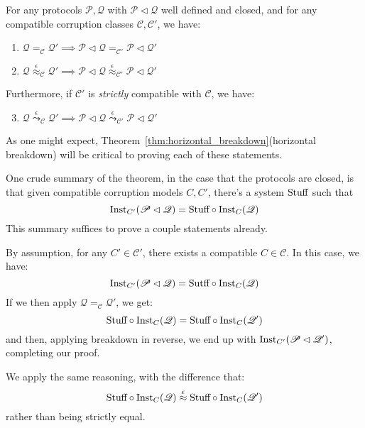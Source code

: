 \begin{theorem}
  \label{thm:horizontal_composition_theorem}
  For any protocols $\mathscr{P}, \mathscr{Q}$ with $\mathscr{P} \lhd \mathscr{Q}$
  well defined and closed, and for any compatible corruption classes $\mathscr{C}, \mathscr{C'}$, we have:
  \begin{enumerate}
    \item $\mathscr{Q} =_{\mathscr{C}} \mathscr{Q}' \implies \mathscr{P} \lhd \mathscr{Q} =_{\mathscr{C}'} \mathscr{P} \lhd \mathscr{Q}'$
    \item $\mathscr{Q} \overset{\epsilon}{\approx}_{\mathscr{C}} \mathscr{Q}' \implies \mathscr{P} \lhd \mathscr{Q} \overset{\epsilon}{\approx}_{\mathscr{C}'} \mathscr{P} \lhd \mathscr{Q}'$
  \end{enumerate}

  Furthermore, if $\mathscr{C}'$ is \emph{strictly} compatible with $\mathscr{C}$,
  we have:
  \begin{enumerate}
    \setcounter{enumi}{2}
    \item $\mathscr{Q} \overset{\epsilon}{\leadsto}_{\mathscr{C}} \mathscr{Q}' \implies \mathscr{P} \lhd \mathscr{Q} \overset{\epsilon}{\leadsto}_{\mathscr{C}'} \mathscr{P} \lhd \mathscr{Q}'$
  \end{enumerate}

   As one might expect,
  Theorem~\ref{thm:horizontal_breakdown}(horizontal breakdown)
  will be critical to proving each of these statements.

  One crude summary of the theorem, in the case
  that the protocols are closed, is that given compatible
  corruption models $C, C'$, there's a system $\text{Stuff}$ such that
  $$
  \text{Inst}_{C'}(\mathscr{P} \lhd \mathscr{Q}) = \text{Stuff} \circ \text{Inst}_C(\mathscr{Q})
  $$
  This summary suffices to prove a couple statements already.

   By assumption, for any $C' \in \mathscr{C}'$,
  there exists a compatible $C \in \mathscr{C}$.
  In this case, we have:
  $$
  \text{Inst}_{C'}(\mathscr{P} \lhd \mathscr{Q}) = \text{Sutff} \circ \text{Inst}_C(\mathscr{Q})
  $$
  If we then apply $\mathscr{Q} =_{\mathscr{C}} \mathscr{Q}'$,
  we get:
  $$
  \text{Stuff} \circ \text{Inst}_C(\mathscr{Q}) = \text{Stuff} \circ \text{Inst}_C(\mathscr{Q}')
  $$
  and then, applying breakdown in reverse, we end up with $\text{Inst}_{C'}(\mathscr{P} \lhd \mathscr{Q}')$,
  completing our proof.

   We apply the same reasoning, with the difference that:
  $$
  \text{Stuff} \circ \text{Inst}_C(\mathscr{Q}) \overset{\epsilon}{\approx} \text{Stuff} \circ \text{Inst}_C(\mathscr{Q}')
  $$
  rather than being strictly equal.


\end{theorem}
